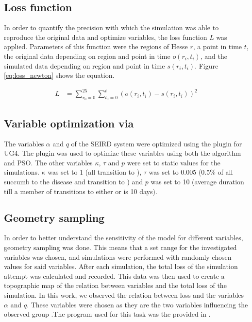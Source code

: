 \subsection{Loss function}
In order to quantify the precision with which the simulation was able to reproduce the original data and optimize variables, the loss function $L$
was applied. Parameters of this function were the regions of Hesse $r$, a point in time $t$, the original data depending on
region and point in time $o(r_i,t_i)$, and the simulated data depending on region and point in time $s(r_i, t_i)$. Figure \ref*{eq:loss_newton}
shows the equation.


\begin{align}
	L &= \sum_{r_0=0}^{25} \sum_{t_{0}=0}^{t} (o(r_i,t_i) - s(r_i,t_i))^{2}
	\label{eq:loss_newton}
\end{align}


\subsection{Variable optimization via }
The variables $\alpha$ and $q$ of the SEIRD system were optimized using the  plugin for UG4\cite{Scheidemann}.
The plugin was used to optimize these variables using both the  algorithm and PSO. The other variables $\kappa$, $\tau$ and $p$ were set to static
values for the simulations. $\kappa$ was set to 1 (all  transition to ), $\tau$ was set to 0.005 (0.5\% of all  succumb to the disease
and transition to ) and $p$ was set to 10 (average duration till a member of  transitions to either  or  is 10 days).




\subsection{Geometry sampling}
In order to better understand the sensitivity of the model for different variables, geometry sampling was done. This means that a set range for the
investigated variables was chosen, and simulations were performed with randomly chosen values for said variables. After each simulation, the total
loss of the simulation attempt was calculated and recorded. This data was then used to create a topographic map of the relation between variables
and the total loss of the simulation. In this work, we observed the relation between loss and the variables $\alpha$ and $q$. These variables
were chosen as they are the two variables influencing the observed group .The program used for this task was the
 provided in .


